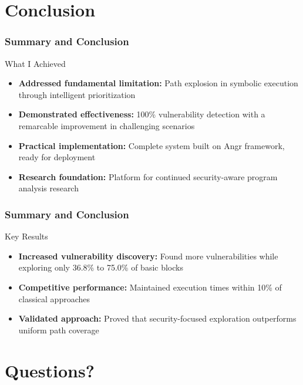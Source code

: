 \documentclass[aspectratio=169]{beamer}
\begin{document}
\section{Conclusion}

\begin{frame}
    \frametitle{Summary and Conclusion}
    \begin{evaluation}{What I Achieved}
        \begin{itemize}
            \item \textbf{Addressed fundamental limitation:} Path explosion in symbolic execution through intelligent prioritization
            \item \textbf{Demonstrated effectiveness:} 100\% vulnerability detection with a remarcable improvement in challenging scenarios
            \item \textbf{Practical implementation:} Complete system built on Angr framework, ready for deployment
            \item \textbf{Research foundation:} Platform for continued security-aware program analysis research
        \end{itemize}
    \end{evaluation}
\end{frame}

\begin{frame}
    \frametitle{Summary and Conclusion}
    \begin{implementation}{Key Results}
        \begin{itemize}
            \item \textbf{Increased vulnerability discovery:} Found more vulnerabilities while exploring only 36.8\% to 75.0\% of basic blocks
            \item \textbf{Competitive performance:} Maintained execution times within 10\% of classical approaches
            \item \textbf{Validated approach:} Proved that security-focused exploration outperforms uniform path coverage
        \end{itemize}
    \end{implementation}
\end{frame}

\section{Questions?}
\end{document}
